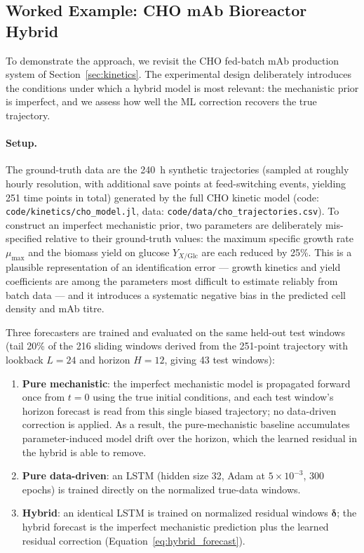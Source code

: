 \subsection{Worked Example: CHO mAb Bioreactor Hybrid}
\label{sec:hybrid_example}

To demonstrate the approach, we revisit the CHO fed-batch mAb production
system of Section~\ref{sec:kinetics}.  The experimental design deliberately
introduces the conditions under which a hybrid model is most relevant: the
mechanistic prior is imperfect, and we assess how well the ML correction
recovers the true trajectory.

\paragraph{Setup.}
The ground-truth data are the 240~h synthetic trajectories (sampled at
roughly hourly resolution, with additional save points at feed-switching
events, yielding 251 time points in total) generated by the full CHO kinetic
model (code: \texttt{code/kinetics/cho\_model.jl},
data: \texttt{code/data/cho\_trajectories.csv}).  To construct an imperfect
mechanistic prior, two parameters are deliberately mis-specified relative to
their ground-truth values: the maximum specific growth rate $\mu_{\max}$ and
the biomass yield on glucose $Y_{X/\mathrm{Glc}}$ are each reduced by 25\%.
This is a plausible representation of an identification error --- growth kinetics
and yield coefficients are among the parameters most difficult to estimate
reliably from batch data --- and it introduces a systematic negative bias in
the predicted cell density and mAb titre.

Three forecasters are trained and evaluated on the same held-out test windows
(tail 20\% of the 216 sliding windows derived from the 251-point trajectory
with lookback $L = 24$ and horizon $H = 12$, giving 43 test windows):
\begin{enumerate}
  \item \textbf{Pure mechanistic}: the imperfect mechanistic model is
    propagated forward once from $t=0$ using the true initial conditions, and
    each test window's horizon forecast is read from this single biased
    trajectory; no data-driven correction is applied.  As a result, the
    pure-mechanistic baseline accumulates parameter-induced model drift over
    the horizon, which the learned residual in the hybrid is able to remove.
  \item \textbf{Pure data-driven}: an LSTM (hidden size 32, Adam at $5 \times 10^{-3}$,
    300 epochs) is trained directly on the normalized true-data windows.
  \item \textbf{Hybrid}: an identical LSTM is trained on normalized
    residual windows $\boldsymbol{\delta}$; the hybrid forecast is the
    imperfect mechanistic prediction plus the learned residual correction
    (Equation~\ref{eq:hybrid_forecast}).
\end{enumerate}

